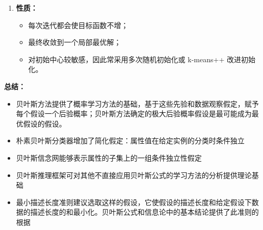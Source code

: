 \documentclass[../main.tex]{subfiles}
\begin{document}
\begin{enumerate}
    \item \textbf{性质：}
    \begin{itemize}
        \item 每次迭代都会使目标函数不增；
        \item 最终收敛到一个局部最优解；
        \item 对初始中心较敏感，因此常采用多次随机初始化或 k-means++ 改进初始化。
    \end{itemize}

\end{enumerate}

\textbf{总结：}
\begin{itemize}
    \item 贝叶斯方法提供了概率学习方法的基础，基于这些先验和数据观察假定，赋予每个假设一个后验概率；贝叶斯方法确定的极大后验概率假设是最可能成为最优假设的假设。
    \item 朴素贝叶斯分类器增加了简化假定：属性值在给定实例的分类时条件独立
    \item 贝叶斯信念网能够表示属性的子集上的一组条件独立性假定
    \item 贝叶斯推理框架可对其他不直接应用贝叶斯公式的学习方法的分析提供理论基础
    \item 最小描述长度准则建议选取这样的假设，它使假设的描述长度和给定假设下数据的描述长度的和最小化。贝叶斯公式和信息论中的基本结论提供了此准则的根据
\end{itemize}
\end{document}
